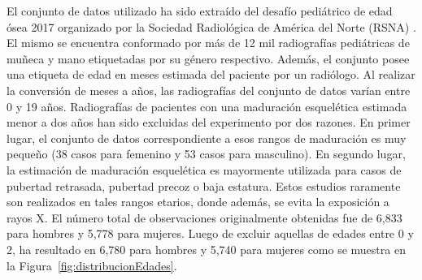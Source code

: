 \documentclass[conference]{IEEEtran}
\begin{document}
El conjunto de datos utilizado ha sido extraído del desafío pediátrico de edad ósea 2017 organizado por la Sociedad Radiológica de América del Norte (RSNA) \cite{RSNAChallenge}. El mismo se encuentra conformado por más de 12 mil radiografías pediátricas de muñeca y mano etiquetadas por su género respectivo. Además, el conjunto posee una etiqueta de edad en meses estimada del paciente por un radiólogo. Al realizar la conversión de meses a años, las radiografías del conjunto de datos varían entre 0 y 19 años.
Radiografías de pacientes con una maduración esquelética estimada menor a dos años han sido excluidas del experimento por dos razones. En primer lugar, el conjunto de datos correspondiente a esos rangos de maduración es muy pequeño (38 casos para femenino y 53 casos para masculino). En segundo lugar, la estimación de maduración esquelética es mayormente utilizada para casos de pubertad retrasada, pubertad precoz o baja estatura. Estos estudios raramente son realizados en tales rangos etarios, donde además, se evita la exposición a rayos X.
El número total de observaciones originalmente obtenidas fue de 6,833 para hombres y 5,778 para mujeres. Luego de excluir aquellas de edades entre 0 y 2, ha resultado en 6,780 para hombres y 5,740 para mujeres como se muestra en la Figura~\ref{fig:distribucionEdades}.
\end{document}
